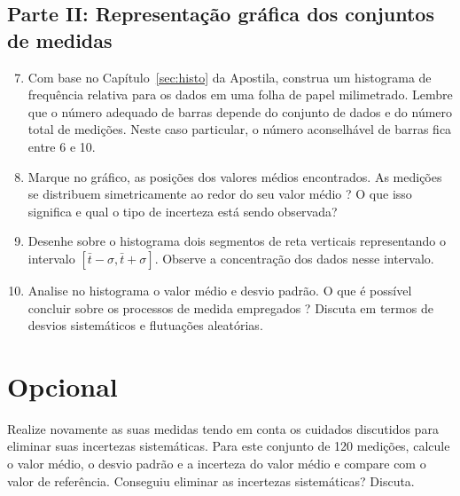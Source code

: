 \subsection*{Parte II:  Representação gráfica dos conjuntos de medidas}

\begin{enumerate}
\setcounter{enumi}{6}

\item Com base no Capítulo~\ref{sec:histo} da Apostila, construa um histograma de frequência relativa para os dados em uma  folha de papel milimetrado. Lembre que o número adequado de barras depende do conjunto de dados e do número total de medições. Neste caso particular, o número aconselhável de barras fica entre 6 e 10. 
 
\item Marque no gráfico, as posições dos valores médios encontrados. As medições se distribuem simetricamente ao redor do seu valor médio ? O que isso significa e qual o tipo de incerteza está sendo observada?

\item Desenhe sobre o histograma dois segmentos de reta verticais  representando o intervalo $[\bar t-\sigma, \bar t+\sigma]$. Observe a concentração dos dados nesse intervalo. 

\item Analise no histograma o valor médio e desvio padrão.  O que é possível concluir sobre os processos de medida empregados ? Discuta em termos de desvios sistemáticos e flutuações aleatórias. 

\end{enumerate}


\section{Opcional} 
Realize novamente as suas medidas tendo em conta os cuidados discutidos para eliminar suas incertezas sistemáticas. Para este conjunto de 120 medições, calcule o valor médio, o desvio padrão e a incerteza do valor médio e compare com o valor de referência. Conseguiu eliminar as incertezas sistemáticas?  Discuta. 


  
